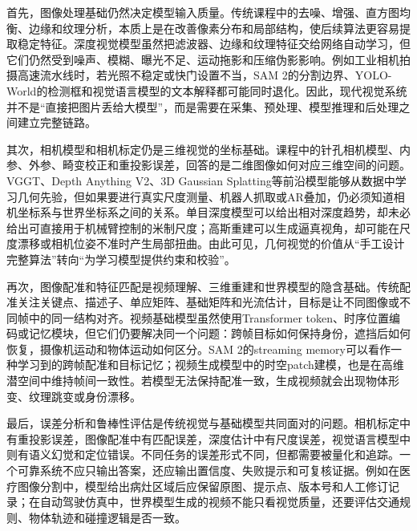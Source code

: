 \documentclass[UTF8,a4paper,12pt]{ctexart}
\newcommand{\model}[1]{\textsf{#1}}
\begin{document}
首先，图像处理基础仍然决定模型输入质量。传统课程中的去噪、增强、直方图均衡、边缘和纹理分析，本质上是在改善像素分布和局部结构，使后续算法更容易提取稳定特征。深度视觉模型虽然把滤波器、边缘和纹理特征交给网络自动学习，但它们仍然受到噪声、模糊、曝光不足、运动拖影和压缩伪影影响。例如工业相机拍摄高速流水线时，若光照不稳定或快门设置不当，\model{SAM 2}的分割边界、\model{YOLO-World}的检测框和视觉语言模型的文本解释都可能同时退化。因此，现代视觉系统并不是“直接把图片丢给大模型”，而是需要在采集、预处理、模型推理和后处理之间建立完整链路。

其次，相机模型和相机标定仍是三维视觉的坐标基础。课程中的针孔相机模型、内参、外参、畸变校正和重投影误差，回答的是二维图像如何对应三维空间的问题。\model{VGGT}、\model{Depth Anything V2}、\model{3D Gaussian Splatting}等前沿模型能够从数据中学习几何先验，但如果要进行真实尺度测量、机器人抓取或AR叠加，仍必须知道相机坐标系与世界坐标系之间的关系。单目深度模型可以给出相对深度趋势，却未必给出可直接用于机械臂控制的米制尺度；高斯重建可以生成逼真视角，却可能在尺度漂移或相机位姿不准时产生局部扭曲。由此可见，几何视觉的价值从“手工设计完整算法”转向“为学习模型提供约束和校验”。

再次，图像配准和特征匹配是视频理解、三维重建和世界模型的隐含基础。传统配准关注关键点、描述子、单应矩阵、基础矩阵和光流估计，目标是让不同图像或不同帧中的同一结构对齐。视频基础模型虽然使用Transformer token、时序位置编码或记忆模块，但它们仍要解决同一个问题：跨帧目标如何保持身份，遮挡后如何恢复，摄像机运动和物体运动如何区分。\model{SAM 2}的streaming memory可以看作一种学习到的跨帧配准和目标记忆；视频生成模型中的时空patch建模，也是在高维潜空间中维持帧间一致性。若模型无法保持配准一致，生成视频就会出现物体形变、纹理跳变或身份漂移。

最后，误差分析和鲁棒性评估是传统视觉与基础模型共同面对的问题。相机标定中有重投影误差，图像配准中有匹配误差，深度估计中有尺度误差，视觉语言模型中则有语义幻觉和定位错误。不同任务的误差形式不同，但都需要被量化和追踪。一个可靠系统不应只输出答案，还应输出置信度、失败提示和可复核证据。例如在医疗图像分割中，模型给出病灶区域后应保留原图、提示点、版本号和人工修订记录；在自动驾驶仿真中，世界模型生成的视频不能只看视觉质量，还要评估交通规则、物体轨迹和碰撞逻辑是否一致。
\end{document}

